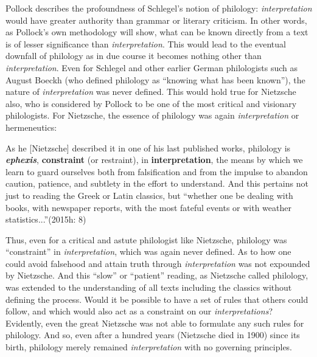 Pollock describes the profoundness of Schlegel’s notion of philology: \textit{interpretation} would have greater authority than grammar or literary criticism. In other words, as Pollock’s own methodology will show, what can be known directly from a text is of lesser significance than \textit{interpretation}. This would lead to the eventual downfall of philology as in due course it becomes nothing other than \textit{interpretation}. Even for Schlegel and other earlier German philologists such as August Boeckh (who defined philology as “knowing what has been known”), the nature of \textit{interpretation} was never defined. This would hold true for Nietzsche also, who is considered by Pollock to be one of the most critical and visionary philologists. For Nietzsche, the essence of philology was again \textit{interpretation} or hermeneutics:

\begin{myquote}
As he [Nietzsche] described it in one of his last published works, philology is \textit{\textbf{ephexis}}, \textbf{constraint} (or restraint), in \textbf{interpretation}, the means by which we learn to guard ourselves both from falsification and from the impulse to abandon caution, patience, and subtlety in the effort to understand. And this pertains not just to reading the Greek or Latin classics, but “whether one be dealing with books, with newspaper reports, with the most fateful events or with weather statistics...”\break (2015h: 8)
\end{myquote}

Thus, even for a critical and astute philologist like Nietzsche, philology was “constraint” in \textit{interpretation}, which was again never defined. As to how one could avoid falsehood and attain truth through \textit{interpretation} was not expounded by Nietzsche. And this “slow” or “patient” reading, as Nietzsche called philology, was extended to the understanding of all texts including the classics without defining the process. Would it be possible to have a set of rules that others could follow, and which would also act as a constraint on our \textit{interpretations}? Evidently, even the great Nietzsche was not able to formulate any such rules for philology. And so, even after a hundred years (Nietzsche died in 1900) since its birth, philology merely remained \textit{interpretation} with no governing principles.

